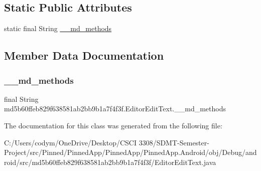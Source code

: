 \subsection*{Static Public Attributes}
\begin{DoxyCompactItemize}
\item 
static final String \hyperlink{classmd5b60ffeb829f638581ab2bb9b1a7f4f3f_1_1_editor_edit_text_ac38db1db19f69806cc1b75f1a04cebda}{\+\_\+\+\_\+md\+\_\+methods}
\end{DoxyCompactItemize}


\subsection{Member Data Documentation}
\mbox{\label{classmd5b60ffeb829f638581ab2bb9b1a7f4f3f_1_1_editor_edit_text_ac38db1db19f69806cc1b75f1a04cebda}} 
\subsubsection{\texorpdfstring{\+\_\+\+\_\+md\+\_\+methods}{\_\_md\_methods}}
{\footnotesize\ttfamily final String md5b60ffeb829f638581ab2bb9b1a7f4f3f.\+Editor\+Edit\+Text.\+\_\+\+\_\+md\+\_\+methods\hspace{0.3cm}{\ttfamily [static]}}



The documentation for this class was generated from the following file\+:\begin{DoxyCompactItemize}
\item 
C\+:/\+Users/codym/\+One\+Drive/\+Desktop/\+C\+S\+C\+I 3308/\+S\+D\+M\+T-\/\+Semester-\/\+Project/src/\+Pinned/\+Pinned\+App/\+Pinned\+App/\+Pinned\+App.\+Android/obj/\+Debug/android/src/md5b60ffeb829f638581ab2bb9b1a7f4f3f/Editor\+Edit\+Text.\+java\end{DoxyCompactItemize}
